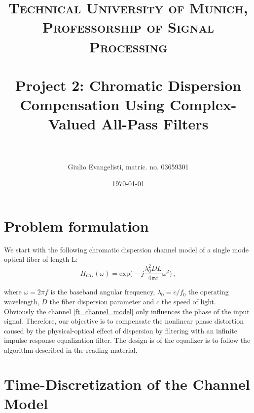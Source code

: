 \documentclass[paper=a4, fontsize=11pt]{scrartcl} %
\title{	
\normalfont \normalsize 
\textsc{Technical University of Munich, Professorship of Signal Processing} \\ [25pt] %
\horrule{0.5pt} \\[0.4cm] %
\huge Project 2: Chromatic Dispersion Compensation Using Complex-Valued All-Pass Filters \\ %
\horrule{2pt} \\[0.5cm] %
}
\author{Giulio Evangelisti, matric. no. 03659301} %
\date{\normalsize\today} %
\numberwithin{equation}{section} %
\numberwithin{figure}{section} %
\numberwithin{table}{section} %
\begin{document}
\maketitle %


\section{Problem formulation}

We start with the following chromatic dispersion channel model of a single mode optical fiber of length L:
\begin{equation} 
H_{CD}(\omega)=\text{exp}\Big(-j\frac{\lambda_{0}^{2}DL}{4\pi c}\omega^2\Big)\label{ft_channel_model}\, ,
\end{equation}

where $\omega=2\pi f$ is the baseband angular frequency, $\lambda_{0}=c/f_0$ the operating wavelength, $D$ the fiber dispersion parameter and $c$ the speed of light.\\
Obviously the channel \eqref{ft_channel_model} only influences the phase of the input signal. Therefore, our objective is to compensate the nonlinear phase distortion caused by the physical-optical effect of dispersion by filtering with an infinite impulse response equalization filter. The design is of the equalizer is to follow the algorithm described in the reading material.


\section{Time-Discretization of the Channel Model}
\end{document}
